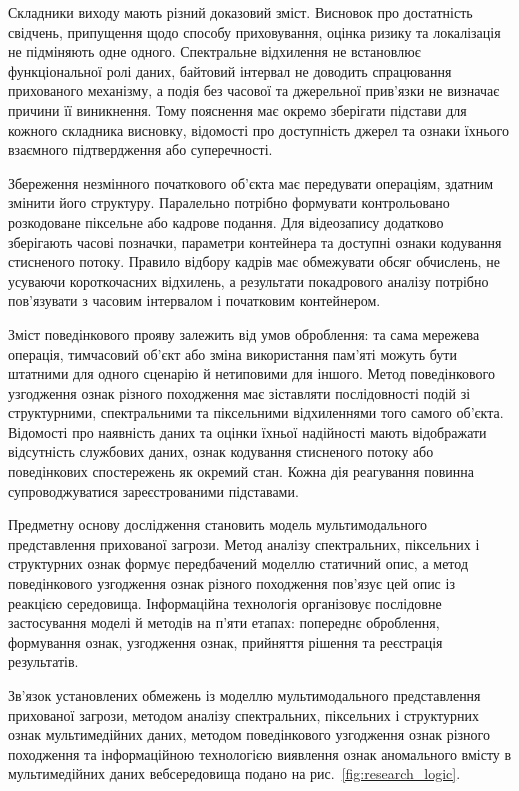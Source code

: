 Складники виходу мають різний доказовий зміст. Висновок про достатність свідчень, припущення щодо способу приховування, оцінка ризику та локалізація не підміняють одне одного. Спектральне відхилення не встановлює функціональної ролі даних, байтовий інтервал не доводить спрацювання прихованого механізму, а подія без часової та джерельної прив’язки не визначає причини її виникнення. Тому пояснення має окремо зберігати підстави для кожного складника висновку, відомості про доступність джерел та ознаки їхнього взаємного підтвердження або суперечності.

Збереження незмінного початкового об’єкта має передувати операціям, здатним змінити його структуру. Паралельно потрібно формувати контрольовано розкодоване піксельне або кадрове подання. Для відеозапису додатково зберігають часові позначки, параметри контейнера та доступні ознаки кодування стисненого потоку. Правило відбору кадрів має обмежувати обсяг обчислень, не усуваючи короткочасних відхилень, а результати покадрового аналізу потрібно пов’язувати з часовим інтервалом і початковим контейнером.

Зміст поведінкового прояву залежить від умов оброблення: та сама мережева операція, тимчасовий об’єкт або зміна використання пам’яті можуть бути штатними для одного сценарію й нетиповими для іншого. Метод поведінкового узгодження ознак різного походження має зіставляти послідовності подій зі структурними, спектральними та піксельними відхиленнями того самого об’єкта. Відомості про наявність даних та оцінки їхньої надійності мають відображати відсутність службових даних, ознак кодування стисненого потоку або поведінкових спостережень як окремий стан. Кожна дія реагування повинна супроводжуватися зареєстрованими підставами.

Предметну основу дослідження становить модель мультимодального представлення прихованої загрози. Метод аналізу спектральних, піксельних і структурних ознак формує передбачений моделлю статичний опис, а метод поведінкового узгодження ознак різного походження пов’язує цей опис із реакцією середовища. Інформаційна технологія організовує послідовне застосування моделі й методів на п’яти етапах: попереднє оброблення, формування ознак, узгодження ознак, прийняття рішення та реєстрація результатів.

Зв’язок установлених обмежень із моделлю мультимодального представлення прихованої загрози, методом аналізу спектральних, піксельних і структурних ознак мультимедійних даних, методом поведінкового узгодження ознак різного походження та інформаційною технологією виявлення ознак аномального вмісту в мультимедійних даних вебсередовища подано на рис.~\ref{fig:research_logic}.


